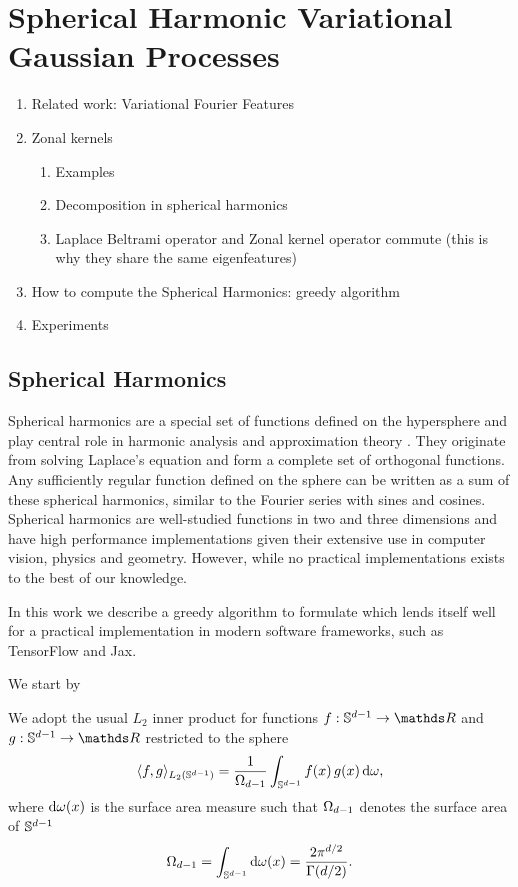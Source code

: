 \chapter{Spherical Harmonic Variational Gaussian Processes}

\begin{enumerate}
    \item Related work: Variational Fourier Features
    \item Zonal kernels
    \begin{enumerate}
        \item Examples
        \item Decomposition in spherical harmonics
        \item Laplace Beltrami operator and Zonal kernel operator commute (this is why they share the same eigenfeatures)
    \end{enumerate}
    \item How to compute the Spherical Harmonics: greedy algorithm
    \item Experiments
\end{enumerate}


\section{Spherical Harmonics}

Spherical harmonics are a special set of functions defined on the hypersphere and play central role in harmonic analysis and approximation theory \citep{wendland2005}. They originate from solving Laplace's equation and form a complete set of orthogonal functions. Any sufficiently regular function defined on the sphere can be written as a sum of these spherical harmonics, similar to the Fourier series with sines and cosines. Spherical harmonics are well-studied functions in two and three dimensions and have high performance implementations given their extensive use in computer vision, physics and geometry. However, while no practical implementations exists to the best of our knowledge.

In this work we describe a greedy algorithm to formulate 
which lends itself well for a practical implementation in modern software frameworks, such as TensorFlow and Jax.

We start by 
\citep{dai2013,frye2014}


We adopt the usual $L_2$ inner product for functions $f: \dsphere \rightarrow \Reals$ and $g: \dsphere \rightarrow \Reals$ restricted to the sphere 
\begin{equation}
     \langle f, g\rangle_{L_{2}(\mathbb{S}^{d-1})} = \frac{1}{\Omega_{d-1}} \int_{\mathbb{S}^{d-1}} f(x)\,g(x) \, \mathrm{d}{\omega},
\end{equation}
where $\mathrm{d}{\omega(x)}$ is the surface area measure such that $\Omega_{d-1}$ denotes the surface area of $\mathbb{S}^{d-1}$ 
\begin{equation}
\label{eq:surface}
    \Omega_{d-1} = \int_{\mathbb{S}^{d-1}} \mathrm{d}{\omega(x)} = \frac{2 \pi ^ {d/2}}{\Gamma(d/2)}.
\end{equation}

